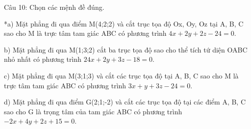 \documentclass[a4paper,12pt]{article}
\begin{document}
Câu 10: Chọn các mệnh đề đúng.

*a) Mặt phẳng đi qua điểm M(4;2;2) và cắt trục tọa độ Ox, Oy, Oz tại A, B, C sao cho M là trực tâm tam giác ABC có phương trình \(4x + 2y + 2z - 24 = 0\).

b) Mặt phẳng đi qua M(1;3;2) cắt ba trục tọa độ sao cho thể tích tứ diện OABC nhỏ nhất có phương trình \(24x + 2y + 3z - 18 = 0\).

c) Mặt phẳng đi qua M(3;1;3) và cắt các trục tọa độ tại A, B, C sao cho M là trực tâm tam giác ABC có phương trình \(3x + y + 3z - 24 = 0\).

d) Mặt phẳng đi qua điểm G(2;1;-2) và cắt các trục tọa độ tại các điểm A, B, C sao cho G là trọng tâm của tam giác ABC có phương trình \(-2x + 4y + 2z + 15 = 0\).
\end{document}
